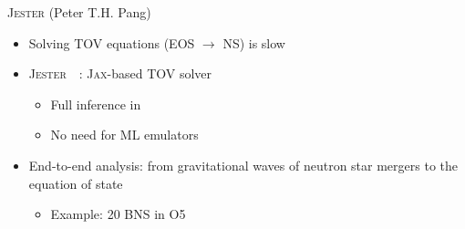 \documentclass[usenames,dvipsnames,t]{beamer}
\newcommand{\ghlink}[1]{\href{https://github.com/#1}{\textcolor{black}{\faGithub}}}
\begin{document}
\begin{frame}{\textsc{Jester} \small (Peter T.H. Pang) \normalsize}
  \def\x{2mm}

  \begin{itemize}


    \item Solving TOV equations (EOS $\rightarrow$ NS) is slow

    \vspace{\x}

    \item<2-> \textsc{Jester}~\ghlink{nuclear-multimessenger-astronomy/jester}~\cite{Wouters:2025zju}: \textsc{Jax}-based TOV solver
    \begin{itemize}
      \item Full inference in 
      \item No need for ML emulators
    \end{itemize}

    \vspace{\x}

    \item<3-> End-to-end analysis: from gravitational waves of neutron star mergers to the equation of state
    \begin{itemize}
      \item Example: 20 BNS in O5
    \end{itemize}
  \end{itemize}

  \vspace{-3mm}


\end{frame}
\end{document}
